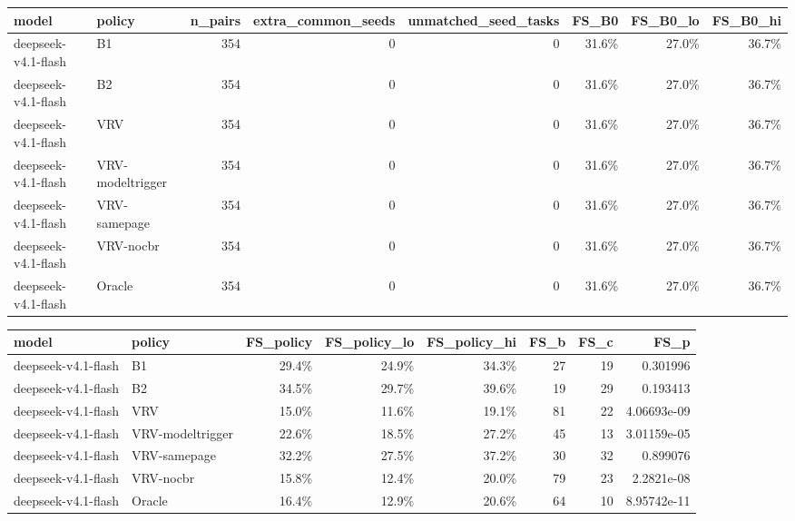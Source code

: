 \begin{tabular}{llrrrrrr}
\toprule
model & policy & n\_pairs & extra\_common\_seeds & unmatched\_seed\_tasks & FS\_B0 & FS\_B0\_lo & FS\_B0\_hi \\
\midrule
deepseek-v4.1-flash & B1 & 354 & 0 & 0 & 31.6\% & 27.0\% & 36.7\% \\
deepseek-v4.1-flash & B2 & 354 & 0 & 0 & 31.6\% & 27.0\% & 36.7\% \\
deepseek-v4.1-flash & VRV & 354 & 0 & 0 & 31.6\% & 27.0\% & 36.7\% \\
deepseek-v4.1-flash & VRV-modeltrigger & 354 & 0 & 0 & 31.6\% & 27.0\% & 36.7\% \\
deepseek-v4.1-flash & VRV-samepage & 354 & 0 & 0 & 31.6\% & 27.0\% & 36.7\% \\
deepseek-v4.1-flash & VRV-nocbr & 354 & 0 & 0 & 31.6\% & 27.0\% & 36.7\% \\
deepseek-v4.1-flash & Oracle & 354 & 0 & 0 & 31.6\% & 27.0\% & 36.7\% \\
\bottomrule
\end{tabular}

\begin{tabular}{llrrrrrr}
\toprule
model & policy & FS\_policy & FS\_policy\_lo & FS\_policy\_hi & FS\_b & FS\_c & FS\_p \\
\midrule
deepseek-v4.1-flash & B1 & 29.4\% & 24.9\% & 34.3\% & 27 & 19 & 0.301996 \\
deepseek-v4.1-flash & B2 & 34.5\% & 29.7\% & 39.6\% & 19 & 29 & 0.193413 \\
deepseek-v4.1-flash & VRV & 15.0\% & 11.6\% & 19.1\% & 81 & 22 & 4.06693e-09 \\
deepseek-v4.1-flash & VRV-modeltrigger & 22.6\% & 18.5\% & 27.2\% & 45 & 13 & 3.01159e-05 \\
deepseek-v4.1-flash & VRV-samepage & 32.2\% & 27.5\% & 37.2\% & 30 & 32 & 0.899076 \\
deepseek-v4.1-flash & VRV-nocbr & 15.8\% & 12.4\% & 20.0\% & 79 & 23 & 2.2821e-08 \\
deepseek-v4.1-flash & Oracle & 16.4\% & 12.9\% & 20.6\% & 64 & 10 & 8.95742e-11 \\
\bottomrule
\end{tabular}


